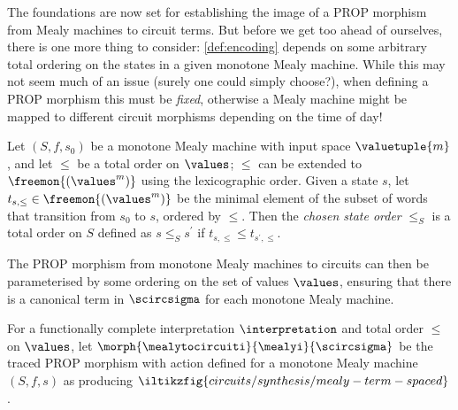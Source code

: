 The foundations are now set for establishing the image of a PROP morphism from
Mealy machines to circuit terms.
But before we get too ahead of ourselves, there is one more thing to consider:
\cref{def:encoding} depends on some arbitrary total ordering on the states in a
given monotone Mealy machine.
While this may not seem much of an issue (surely one could simply choose?), when
defining a PROP morphism this must be \emph{fixed}, otherwise a Mealy machine
might be mapped to different circuit morphisms depending on the time of day!

\begin{definition}
    Let \((S, f, s_0)\) be a monotone Mealy machine with input space
    \(\valuetuple{m}\), and let \(\leq\) be a total order on \(\values\);
    \(\leq\) can be extended to \(\freemon{(\values^m)}\) using the
    lexicographic order.
    Given a state \(s\), let \(t_{s,\leq} \in \freemon{(\values^m)}\) be
    the minimal element of the subset of words that transition from \(s_0\) to
    \(s\), ordered by \(\leq\).
    Then the \emph{chosen state order} \(\leq_S\) is a total order on \(S\)
    defined as \(s \leq_S s^\prime\) if \(t_{s,\leq} \leq t_{s^\prime,\leq}\).
\end{definition}

The PROP morphism from monotone Mealy machines to circuits can then be
parameterised by some ordering on the set of values \(\values\), ensuring that
there is a canonical term in \(\scircsigma\) for each monotone Mealy machine.

\begin{definition}\label{def:mealy-to-circuit}
    For a functionally complete interpretation \(\interpretation\) and total
    order \(\leq\) on \(\values\), let \(
        \morph{
            \mealytocircuiti
        }{
            \mealyi
        }{
            \scircsigma
        }
    \) be the traced PROP morphism with action defined for a monotone Mealy
    machine \((S,f,s)\) as producing \(
        \iltikzfig{circuits/synthesis/mealy-term-spaced}
    \).
\end{definition}

